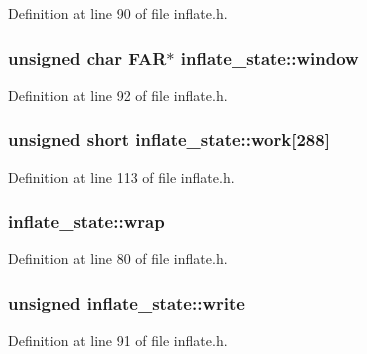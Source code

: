Definition at line 90 of file inflate.\-h.

\hypertarget{structinflate__state_a9cc4c0bde426383731394dcf91c40673}{
\subsubsection[{window}]{\setlength{\rightskip}{0pt plus 5cm}unsigned char F\-A\-R$\ast$ inflate\-\_\-state\-::window}}\label{structinflate__state_a9cc4c0bde426383731394dcf91c40673}


Definition at line 92 of file inflate.\-h.

\hypertarget{structinflate__state_a85403907f7f5b9d355821ffa2591456c}{
\subsubsection[{work}]{\setlength{\rightskip}{0pt plus 5cm}unsigned short inflate\-\_\-state\-::work\mbox{[}288\mbox{]}}}\label{structinflate__state_a85403907f7f5b9d355821ffa2591456c}


Definition at line 113 of file inflate.\-h.

\hypertarget{structinflate__state_a990d157b5c0d4ba178c3361de9ce6561}{
\subsubsection[{wrap}]{ inflate\-\_\-state\-::wrap}}\label{structinflate__state_a990d157b5c0d4ba178c3361de9ce6561}


Definition at line 80 of file inflate.\-h.

\hypertarget{structinflate__state_a8b89588c1a322e622ebb694d8daa644c}{
\subsubsection[{write}]{\setlength{\rightskip}{0pt plus 5cm}unsigned inflate\-\_\-state\-::write}}\label{structinflate__state_a8b89588c1a322e622ebb694d8daa644c}


Definition at line 91 of file inflate.\-h.

